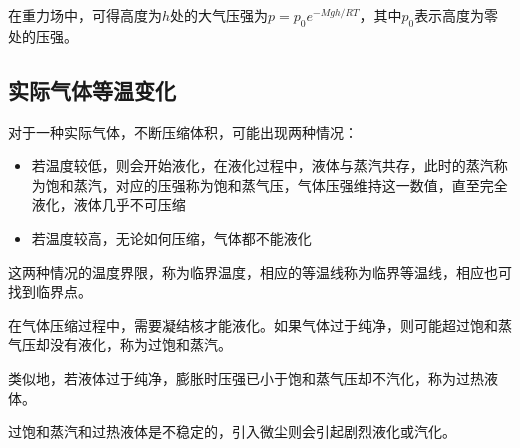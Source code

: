 在重力场中，可得高度为$h$处的大气压强为$p=p_0e^{-Mgh/RT}$，其中$p_0$表示高度为零处的压强。

\subsection{实际气体等温变化}

对于一种实际气体，不断压缩体积，可能出现两种情况：
\begin{itemize}
    \item 若温度较低，则会开始液化，在液化过程中，液体与蒸汽共存，此时的蒸汽称为饱和蒸汽，对应的压强称为饱和蒸气压，气体压强维持这一数值，直至完全液化，液体几乎不可压缩
    \item 若温度较高，无论如何压缩，气体都不能液化
\end{itemize}

这两种情况的温度界限，称为临界温度，相应的等温线称为临界等温线，相应也可找到临界点。

在气体压缩过程中，需要凝结核才能液化。如果气体过于纯净，则可能超过饱和蒸气压却没有液化，称为过饱和蒸汽。

类似地，若液体过于纯净，膨胀时压强已小于饱和蒸气压却不汽化，称为过热液体。

过饱和蒸汽和过热液体是不稳定的，引入微尘则会引起剧烈液化或汽化。